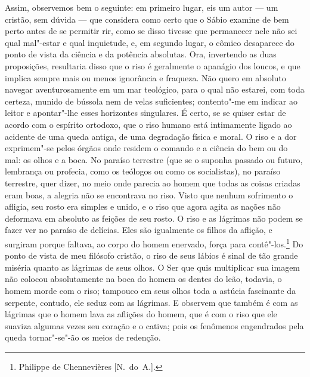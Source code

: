 Assim, observemos bem o seguinte: em primeiro lugar, eis um autor --- um
cristão, sem dúvida --- que considera como certo que o Sábio examine de
bem perto antes de se permitir rir, como se disso tivesse que
permanecer nele não sei qual mal"-estar e qual inquietude, e, em segundo
lugar, o cômico desaparece do ponto de vista da ciência e da potência
absolutas. Ora, invertendo as duas proposições, resultaria disso que o
riso é geralmente o apanágio dos loucos, e que implica sempre mais ou
menos ignorância e fraqueza. Não quero em absoluto navegar
aventurosamente em um mar teológico, para o qual não estarei, com toda
certeza, munido de bússola nem de velas suficientes; contento"-me em
indicar ao leitor e apontar"-lhe esses horizontes singulares. É certo,
se se quiser estar de acordo com o espírito ortodoxo, que o riso humano
está intimamente ligado ao acidente de uma queda antiga, de uma
degradação física e moral. O riso e a dor exprimem"-se pelos órgãos onde
residem o comando e a ciência do bem ou do mal: os olhos e a boca. No
paraíso terrestre (que se o suponha passado ou futuro, lembrança ou
profecia, como os teólogos ou como os socialistas), no paraíso
terrestre, quer dizer, no meio onde parecia ao homem que todas as
coisas criadas eram boas, a alegria não se encontrava no riso. Visto
que nenhum sofrimento o afligia, seu rosto era simples e unido, e o
riso que agora agita as nações não deformava em absoluto as feições de
seu rosto. O riso e as lágrimas não podem se fazer ver no paraíso de
delícias. Eles são igualmente os filhos da aflição, e surgiram porque
faltava, ao corpo do homem enervado, força para contê"-los.\footnote{
Philippe de Chennevières [N.~do~A.].} Do ponto de vista de meu filósofo	
cristão, o riso de seus lábios é sinal de tão grande miséria quanto as
lágrimas de seus olhos. O Ser que quis multiplicar sua imagem não
colocou absolutamente na boca do homem os dentes do leão, todavia, o
homem morde com o riso; tampouco em seus olhos toda a astúcia
fascinante da serpente, contudo, ele seduz com as lágrimas. E observem
que também é com as lágrimas que o homem lava as aflições do homem, que
é com o riso que ele suaviza algumas vezes seu coração e o cativa; pois
os fenômenos engendrados pela queda tornar"-se"-ão os meios de redenção.

